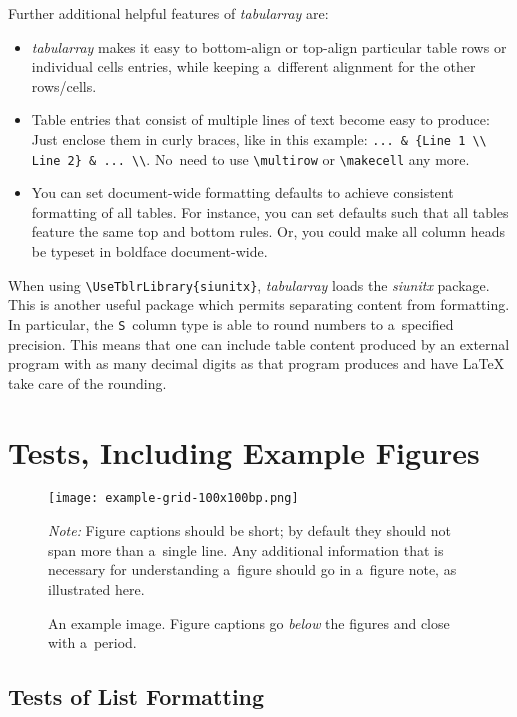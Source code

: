 \documentclass[12pt, a4paper, oneside]{article}
\newlength{\footnotelinespacing}
\newlength{\fsfootnote}
\let \footnotesizeOrig \footnotesize
\renewcommand{\footnotesize}{\footnotesizeOrig\fontsize{\fsfootnote}{\footnotelinespacing}\selectfont}
\renewcommand{\caps}[1]{{\textscale{0.97}{\textls[50]{\MakeUppercase{#1}}}}}
\newenvironment{figurenotes}[1][Note]
	{\par\justifying\medskip\begingroup\footnotesize\noindent\strut\textit{#1:} \ignorespaces}
	{\par\endgroup}
\theoremstyle{Plain}
\theoremstyle{Definition}
\theoremstyle{Remark}
\begin{document}
Further additional helpful features of \mbox{\textit{tabularray}} are:
\begin{itemize}
	\item \mbox{\textit{tabularray}} makes it easy to bottom-align or top-align particular table rows or individual cells entries, while keeping a~different alignment for the other rows\slash cells.
	\item Table entries that consist of multiple lines of text become easy to produce: Just enclose them in curly braces, like in this example: \verb|... & {Line 1 \\ Line 2} & ... \\|. No~need to use \verb|\multirow| or \verb|\makecell| any more.
	\item You can set document-wide formatting defaults to achieve consistent formatting of all tables. For instance, you can set defaults such that all tables feature the same top and bottom rules. Or, you could make all column heads be typeset in boldface document-wide.
\end{itemize}

When using \verb|\UseTblrLibrary{siunitx}|, \mbox{\textit{tabularray}} loads the \mbox{\textit{siunitx}} package. This is another useful package which permits separating content from formatting. In particular, the \verb|S|~column type is able to round numbers to a~specified precision. This means that one can include table content produced by an external program with as many decimal digits as that program produces and have LaTeX take care of the rounding.

\section{Tests, Including Example Figures}
\label{sec:tests}

\begin{figure}
	\texttt{[image: example-grid-100x100bp.png]}%
	\caption{An example \caps{PNG} image. Figure captions go \emph{below} the figures and close with a~period.}
	\label{fig:png}
	\begin{figurenotes}
		Figure captions should be short; by default they should not span more than a~single line. Any additional information that is necessary for understanding a~figure should go in a~figure note, as illustrated here.
	\end{figurenotes}
\end{figure}

\subsection{Tests of List Formatting}
\label{sec:tests:lists}
\end{document}
